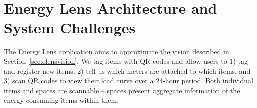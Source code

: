 




\section{Energy Lens Architecture and System Challenges}
The Energy Lens application aims to approximate the vision described in Section~\ref{sec:elensvision}.  We tag
items with QR codes and allow users to 1) tag and register new items, 
2) tell us which meters are attached to which items, and 3) scan QR codes to view their load curve over a 
24-hour period.  Both individual items and spaces are scannable -- spaces present aggregate information
of the energy-consuming items within them.

